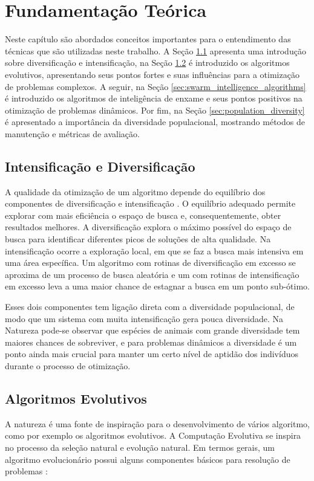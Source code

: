 \chapter{Fundamentação Teórica}
\label{ch:fundamentos}

Neste capítulo são abordados conceitos importantes para o entendimento das técnicas que são utilizadas neste trabalho. A Seção \ref{sec:intesification_diversification} apresenta uma introdução sobre diversificação e intensificação, na Seção \ref{sec:evolutionary_algorithms} é introduzido os algoritmos evolutivos, apresentando seus pontos fortes e suas influências para a otimização de problemas complexos. A seguir, na Seção \ref{sec:swarm_intelligence_algorithms} é introduzido os algoritmos de inteligência de enxame e seus pontos positivos na otimização de problemas dinâmicos. Por fim, na Seção \ref{sec:population_diversity} é apresentado a importância da diversidade populacional, mostrando métodos de manutenção e métricas de avaliação.

\section{Intensificação e Diversificação}
\label{sec:intesification_diversification}

A qualidade da otimização de um algoritmo depende do equilíbrio dos componentes de diversificação e intensificação \cite{vcrepinvsek2013exploration}. O equilíbrio adequado permite explorar com mais eficiência o espaço de busca e, consequentemente, obter resultados melhores. A diversificação explora o máximo possível do espaço de busca para identificar diferentes picos de soluções de alta qualidade. Na intensificação ocorre a exploração local, em que se faz a busca mais intensiva em uma área específica. Um algoritmo com rotinas de diversificação em excesso se aproxima de um processo de busca aleatória e um com rotinas de intensificação em excesso leva a uma maior chance de estagnar a busca em um ponto sub-ótimo. 

Esses dois componentes tem ligação direta com a diversidade populacional, de modo que um sistema com muita intensificação gera pouca diversidade. Na Natureza pode-se observar que espécies de animais com grande diversidade tem maiores chances de sobreviver, e para problemas dinâmicos a diversidade é um ponto ainda mais crucial para manter um certo nível de aptidão dos indivíduos durante o processo de otimização.

\section{Algoritmos Evolutivos}
\label{sec:evolutionary_algorithms}
A natureza é uma fonte de inspiração para o desenvolvimento de vários algoritmo, como por exemplo os algoritmos evolutivos. A Computação Evolutiva se inspira no processo da seleção natural e evolução natural. 
Em termos gerais, um algoritmo evolucionário possui alguns componentes básicos para resolução de problemas \cite{parpinelli2011new}:


